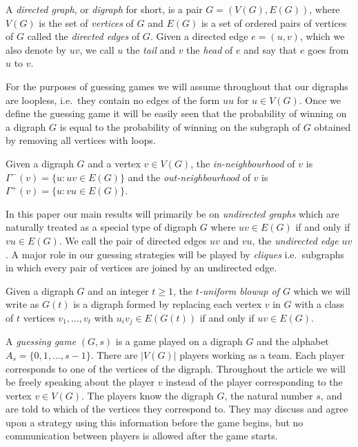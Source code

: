 \documentclass[a4paper, 14pt]{extarticle}
\theoremstyle{plain}
\begin{document}
A \emph{directed graph}, or \emph{digraph} for short, is a pair
$G=(V(G),E(G))$, where $V(G)$ is the set of \emph{vertices} of $G$ and $E(G)$ is a
set of ordered pairs of vertices of $G$ called the \emph{directed edges} of $G$. Given a directed edge $e = (u,v)$, which we also denote by $uv$, we call $u$ the
\emph{tail} and $v$ the \emph{head} of $e$ and say that $e$ goes from $u$ to $v$.

For the purposes of guessing games we will assume throughout that our digraphs are loopless, i.e.\ they contain no edges of the form $uu$ for $u \in V(G)$. Once we define the guessing game it will be easily seen that the probability of winning on a digraph $G$ is equal to the probability of winning on the subgraph of $G$ obtained by removing all vertices with loops.


Given a digraph $G$ and a vertex $v\in V(G)$, the
\emph{in-neighbourhood} of $v$ is $\Gamma^-(v) = \{u : uv \in
E(G)\}$ and the \emph{out-neighbourhood}
of $v$ is $\Gamma^+(v) = \{u : vu\in E(G)\}$.

In this paper our main results will primarily be on \emph{undirected
graphs} which are naturally treated as a special type of digraph $G$ where
$uv\in E(G)$ if and only if $vu\in E(G)$. We call the pair of
directed edges $uv$ and $vu$, the \emph{undirected edge} $uv$. A major role in our guessing strategies will be played by \emph{cliques} i.e.\ subgraphs in which every pair of
vertices are joined by an undirected edge.

Given a digraph $G$ and an integer $t\geq 1$, the \emph{$t$-uniform
blowup of $G$} which we will write as $G(t)$ is a digraph formed by
replacing each vertex $v$ in $G$ with a class of $t$ vertices
$v_1,\ldots,v_t$ with $u_iv_j\in E(G(t))$ if and only if $uv \in
E(G)$.

A \emph{guessing game} $(G,s)$ is a game played on a digraph $G$ and
the alphabet $A_s = \{0,1,\ldots,s-1\}$. There are $|V(G)|$ players
working as a team. Each player corresponds to one of the vertices
of the digraph. Throughout the article we will be freely speaking about the player $v$ instead of the player corresponding to the vertex $v \in V(G)$. The players know the digraph $G$, the natural number $s$, and are told to which of the vertices they correspond to. They may discuss and agree upon
a strategy using this information before the game begins, but no
communication between players is allowed after the game starts.
\end{document}

